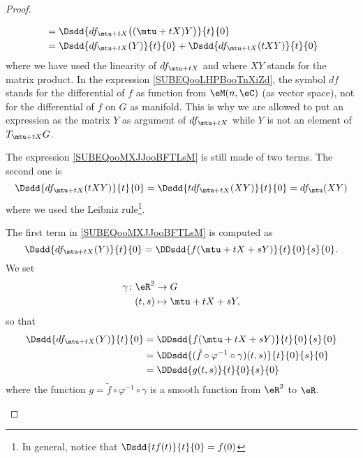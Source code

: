 \begin{proof}
\begin{subproof}
\begin{subequations}
\begin{align}
				                                  & =\Dsdd{ df_{\mtu+tX}\big( (\mtu+tX)Y \big) }{t}{0} \label{SUBEQooLHPBooTnXiZd}                 \\
				                                  & =\Dsdd{ df_{\mtu+tX}(Y) }{t}{0}+\Dsdd{ df_{\mtu+tX}(tXY) }{t}{0}   \label{SUBEQooMXJJooBFTLsM}
			\end{align}
		\end{subequations}
		where we have used the linearity of \( df_{\mtu+tX}\) and where \( XY\) stands for the matrix product. In the expression \eqref{SUBEQooLHPBooTnXiZd}, the symbol \( df\) stands for the differential of \( f\) as function from \( \eM(n,\eC)\) (as vector space), not for the differential of \( f\) on \( G\) as manifold. This is why we are allowed to put an expression as the matrix \( Y\) as argument of \( df_{\mtu+tX}\) while \( Y\) is not an element of \( T_{\mtu+tX}G\).

		The expression \eqref{SUBEQooMXJJooBFTLsM} is still made of two terms. The second one is
		\begin{equation}
			\Dsdd{ df_{\mtu+tX}(tXY) }{t}{0}=\Dsdd{ tdf_{\mtu+tX}(XY) }{t}{0}=df_{\mtu}(XY)
		\end{equation}
		where we used the Leibniz rule\footnote{In general, notice that \( \Dsdd{ tf(t) }{t}{0}=f(0)\)}.

		The first term in \eqref{SUBEQooMXJJooBFTLsM} is computed as
		\begin{equation}
			\Dsdd{ df_{\mtu+tX}(Y) }{t}{0}=\DDsdd{ f(\mtu+tX+sY) }{t}{0}{s}{0}.
		\end{equation}
		We set
		\begin{equation}
			\begin{aligned}
				\gamma\colon \eR^2 & \to G               \\
				(t,s)              & \mapsto \mtu+tX+sY,
			\end{aligned}
		\end{equation}
		so that
		\begin{subequations}
			\begin{align}
				\Dsdd{ df_{\mtu+tX}(Y) }{t}{0} & =\DDsdd{ f(\mtu+tX+sY) }{t}{0}{s}{0}                               \\
				                               & =\DDsdd{ (\tilde f\circ\varphi^{-1}\circ\gamma)(t,s) }{t}{0}{s}{0} \\
				                               & =\DDsdd{ g(t,s) }{t}{0}{s}{0}
			\end{align}
		\end{subequations}
		where the function \( g=\tilde f\circ\varphi^{-1}\circ \gamma\) is a smooth function from \( \eR^2\) to \( \eR\).


\end{subproof}
\end{proof}
